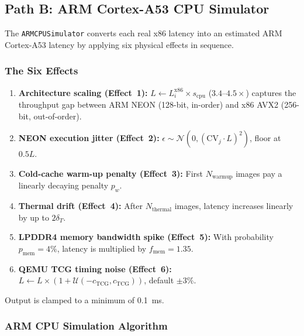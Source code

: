\subsection{Path B: ARM Cortex-A53 CPU Simulator}
\label{sec:m2_arm_cpu_sim}

The \texttt{ARMCPUSimulator} converts each real x86 latency into an estimated
ARM Cortex-A53 latency by applying six physical effects in sequence.

\subsubsection{The Six Effects}

\begin{enumerate}[itemsep=1pt, topsep=3pt]
    \item \textbf{Architecture scaling (Effect~1):} $L \gets L_i^{\text{x86}}
          \times s_{\text{cpu}}$ ($3.4$--$4.5\times$) captures the throughput
          gap between ARM NEON (128-bit, in-order) and x86 AVX2 (256-bit,
          out-of-order).
    \item \textbf{NEON execution jitter (Effect~2):}
          $\epsilon\sim\mathcal{N}(0,(\mathrm{CV}_j\cdot L)^2)$, floor at
          $0.5L$.
    \item \textbf{Cold-cache warm-up penalty (Effect~3):} First
          $N_{\text{warmup}}$ images pay a linearly decaying penalty $p_w$.
    \item \textbf{Thermal drift (Effect~4):} After $N_{\text{thermal}}$ images,
          latency increases linearly by up to $2\delta_T$.
    \item \textbf{LPDDR4 memory bandwidth spike (Effect~5):} With probability
          $p_{\text{mem}}=4\%$, latency is multiplied by $f_{\text{mem}}=1.35$.
    \item \textbf{QEMU TCG timing noise (Effect~6):}
          $L \gets L\times(1+\mathcal{U}(-c_{\text{TCG}},c_{\text{TCG}}))$,
          default $\pm3\%$.
\end{enumerate}

Output is clamped to a minimum of 0.1~ms.

\subsubsection{ARM CPU Simulation Algorithm}

